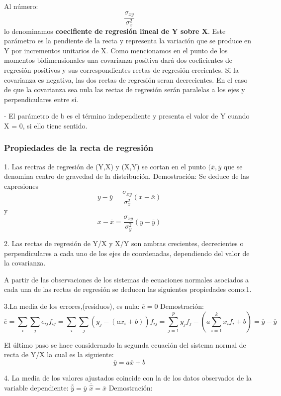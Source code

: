 \documentclass{article}
\begin{document}
	Al número: $$\frac{\sigma_{xy}}{\sigma_x^2}$$ lo denominamos \textbf{coecifiente de regresión lineal de Y sobre X}. Este parámetro es la pendiente de la recta y representa la variación que se produce en Y por incrementos unitarios de X. Como mencionamos en el punto de los momentos bidimensionales una covarianza positiva dará dos coeficientes de regresión positivos y sus correspondientes rectas de regresión crecientes. Si la covarianza es negativa, las dos rectas de regresión seran decrecientes. En el caso de que la covarianza sea nula las rectas de regresión serán paralelas a los ejes y perpendiculares entre sí.
	
	- El parámetro de b es el término independiente y presenta el valor de Y cuando X = 0, si ello tiene sentido.
	
	\subsubsection{Propiedades de la recta de regresión}
	
1. Las rectras de regresión de (Y,X) y (X,Y)  se cortan en el punto $(\overline{x},\overline{y}$ que se denomina centro de gravedad de la distribución.
Demostración: Se deduce de las expresiones
$$ y - \overline{y} = \frac{\sigma_{xy}}{\sigma_x^2} (x - \overline{x}) $$
y 
$$ x - \overline{x} = \frac{\sigma_{xy}}{\sigma_y^2} (y - \overline{y} ) $$
	 
2. Las rectas de regresión de Y/X y X/Y son ambras crecientes, decrecientes o perpendiculares a cada uno de los ejes de coordenadas, dependiendo del valor de la covarianza.

A partir de las observaciones de los sistemas de ecuaciones normales asociados a cada una de las rectas de regresión se deducen las siguientes propiedades como:1.

3.La media de los errores,(residuos), es nula: $\overline{e} = 0$
Demostración:
	$$\overline{e} = \sum_i \sum_j e_{ij}f_{ij} = \sum_i \sum_j ( y_j - (ax_i +b )) f_{ij} = \sum_{j=1}^p y_j f_j - (a \sum_{i=1}^k x_i f_i +b) = \overline{y} - \overline{y} $$
	
	El último paso se hace considerando la segunda ecuación del sistema normal de recta de Y/X la cual es la siguiente:
	$$ \overline{y} = a\overline{x} + b $$
	
4. La media de los valores ajustados coincide con la de los datos observados de la variable dependiente: $\overline{\hat{y}} = \overline{y} $ $\overline{\hat{x}} = \overline{x}$
Demostración:
\end{document}
